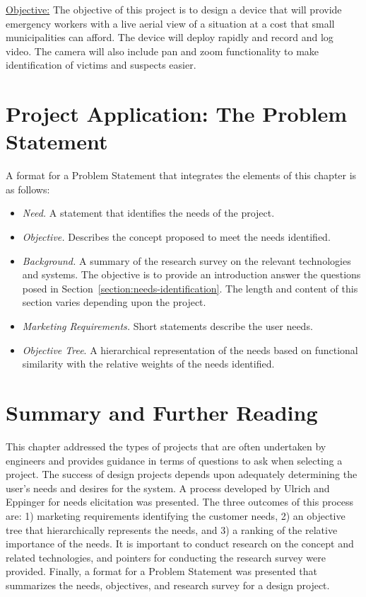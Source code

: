 \ul{Objective:} The objective of this project is to design a device that
will provide emergency workers with a live aerial view of a situation at
a cost that small municipalities can afford. The device will deploy
rapidly and record and log video. The camera will also include pan and
zoom functionality to make identification of victims and suspects
easier.

\section{Project Application: The Problem Statement}
\label{section:project-application-the-problem-statement}

A format for a Problem Statement that integrates the elements of this
chapter is as follows:

\begin{itemize}
\item
  \emph{Need.} A statement that identifies the needs of the project.
\item
  \emph{Objective.} Describes the concept proposed to meet the needs
  identified.
\item
  \emph{Background.} A summary of the research survey on the relevant
  technologies and systems. The objective is to provide an introduction
  answer the questions posed in Section~\ref{section:needs-identification}. 
  The length and content of
  this section varies depending upon the project.
\item
  \emph{Marketing Requirements.} Short statements describe the user
  needs.
\item
  \emph{Objective Tree}. A hierarchical representation of the needs
  based on functional similarity with the relative weights of the needs
  identified.
\end{itemize}

\section{Summary and Further Reading}
\label{section:summary-and-further-reading}

This chapter addressed the types of projects that are often undertaken
by engineers and provides guidance in terms of questions to ask when
selecting a project. The success of design projects depends upon
adequately determining the user's needs and desires for the system. A
process developed by Ulrich and Eppinger for needs elicitation was
presented. The three outcomes of this process are: 1) marketing
requirements identifying the customer needs, 2) an objective tree that
hierarchically represents the needs, and 3) a ranking of the relative
importance of the needs. It is important to conduct research on the
concept and related technologies, and pointers for conducting the
research survey were provided. Finally, a format for a Problem Statement
was presented that summarizes the needs, objectives, and research survey
for a design project.

